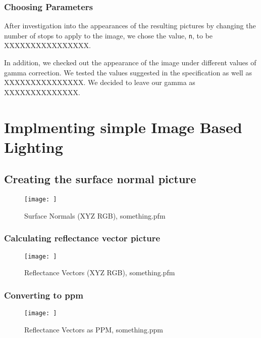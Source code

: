 \documentclass{article}
\begin{document}
\subsubsection{Choosing Parameters}
After investigation into the appearances of the resulting pictures 
by changing the number of stops to apply to the image, we chose
the value, \texttt{n}, to be XXXXXXXXXXXXXXXX. 

In addition, we checked out the appearance of the image under 
different values of gamma correction. We tested the values suggested
in the specification as well as XXXXXXXXXXXXXXX. We decided to leave
our gamma as XXXXXXXXXXXXXX.

\section{Implmenting simple Image Based Lighting}
\subsection{Creating the surface normal picture}
\begin{center}
	\begin{figure}[H]
		\begin{center}
			\texttt{[image: ]}
			\caption{Surface Normals (XYZ \Rightarrow RGB), something.pfm}
		\end{center}
	\end{figure}
\end{center}

\subsubsection{Calculating reflectance vector picture}
\begin{center}
	\begin{figure}[H]
		\begin{center}
			\texttt{[image: ]}
			\caption{Reflectance Vectors (XYZ \Rightarrow RGB), something.pfm}
		\end{center}
	\end{figure}
\end{center}

\subsubsection{Converting to ppm}
\begin{center}
	\begin{figure}[H]
		\begin{center}
			\texttt{[image: ]}
			\caption{Reflectance Vectors as PPM, something.ppm}
		\end{center}
	\end{figure}
\end{center}
\end{document}
